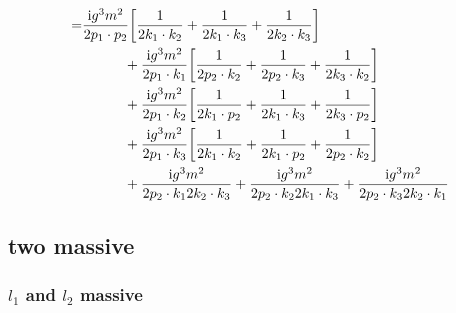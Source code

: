 \begin{align*}
    =&\frac{ \textnormal{i} g^3m^2}{2p_1\cdot p_2}\qty[ \frac{1}{2k_1\cdot k_2}+\frac{1}{2k_1\cdot k_3}+\frac{1}{2k_2\cdot k_3}]\\
    &\quad\quad\quad+\frac{ \textnormal{i} g^3m^2}{2p_1\cdot k_1}\qty[ \frac{1}{2p_2\cdot k_2}+\frac{1}{2p_2\cdot k_3}+\frac{1}{2k_3\cdot k_2}]\\
    &\quad\quad\quad+\frac{ \textnormal{i} g^3m^2}{2p_1\cdot k_2}\qty[ \frac{1}{2k_1\cdot p_2}+\frac{1}{2k_1\cdot k_3}+\frac{1}{2k_3\cdot p_2}]\\
    &\quad\quad\quad+\frac{ \textnormal{i} g^3m^2}{2p_1\cdot k_3}\qty[ \frac{1}{2k_1\cdot k_2}+\frac{1}{2k_1\cdot p_2}+\frac{1}{2p_2\cdot k_2}]\\
    &\quad\quad\quad+ \frac{\textnormal{i} g^3m^2}{2p_2\cdot k_12k_2\cdot k_3}+ \frac{\textnormal{i} g^3m^2}{2p_2\cdot k_22k_1\cdot k_3}+ \frac{\textnormal{i} g^3m^2}{2p_2\cdot k_32k_2\cdot k_1}
\end{align*}

\subsection{two massive}

\subsubsection{$l_1$ and $l_2$ massive}

